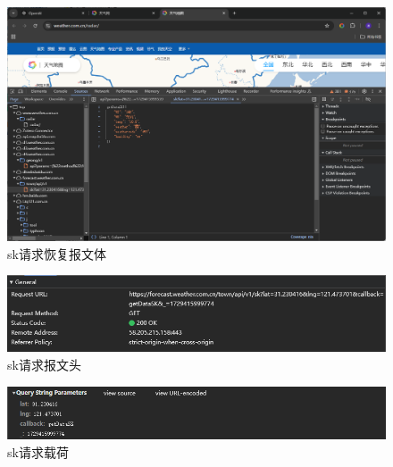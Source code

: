 \begin{figure}[!htbp]
    \centering
    \includegraphics[width=\textwidth]{figures/weather_info_content.png}
    \caption{sk请求恢复报文体}\label{weatherinfocontent}
\end{figure}

\begin{figure}[!htbp]
    \centering
    \includegraphics[width=\textwidth]{figures/weather_info_head.png}
    \caption{sk请求报文头}\label{weatherinfohead}
\end{figure}

\begin{figure}[!htbp]
    \centering
    \includegraphics[width=\textwidth]{figures/weather_info_load.png}
    \caption{sk请求载荷}\label{weatherinfoload}
\end{figure}

